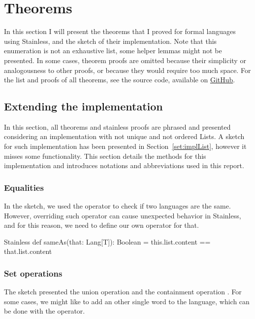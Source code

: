 \section{Theorems}

In this section I will present the theorems that I proved for formal languages using Stainless, and the sketch of their implementation. Note that this enumeration is not an exhaustive list, some helper lemmas might not be presented. In some cases, theorem proofs are omitted because their simplicity or analogousness to other proofs, or because they would require too much space. For the list and proofs of all theorems, see the source code, available on \href{https://github.com/czipobence/semesterProject-2017-autumn-assignments/tree/master/FormalLanguages}{GitHub}.

\subsection{Extending the implementation}

In this section, all theorems and stainless proofs are phrased and presented considering an implementation with not unique and not ordered Lists. A sketch for such implementation has been presented in Section~\ref{set:implList}, however it misses some functionality. This section details the methods for this implementation and introduces notations and abbreviations used in this report.

\subsubsection{Equalities}

In the sketch, we used the \inline{==} operator to check if two languages are the same. However, overriding such operator can cause unexpected behavior in Stainless, and for this reason, we need to define our own operator for that.

\begin{ShortCode}{Stainless}
 def sameAs(that: Lang[T]): Boolean = {
   this.list.content == that.list.content
 }
\end{ShortCode}

\subsubsection{Set operations}

The sketch presented the union operation \inline{++} and the containment operation . For some cases, we might like to add an other single word to the language, which can be done with the \inline{::} operator.

